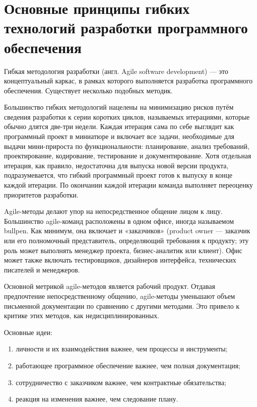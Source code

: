 \documentclass{article}
\let\stdsection\section
\renewcommand\section{\newpage\stdsection}
\begin{document}
\section{Основные принципы гибких технологий разработки программного обеспечения}
    Гибкая методология разработки (англ. Agile software development) — это концептуальный каркас, в рамках которого выполняется разработка программного обеспечения. Существует несколько подобных методик.

    Большинство гибких методологий нацелены на минимизацию рисков путём сведения разработки к серии коротких циклов, называемых итерациями, которые обычно длятся две-три недели. Каждая итерация сама по себе выглядит как программный проект в миниатюре и включает все задачи, необходимые для выдачи мини-прироста по функциональности: планирование, анализ требований, проектирование, кодирование, тестирование и документирование. Хотя отдельная итерация, как правило, недостаточна для выпуска новой версии продукта, подразумевается, что гибкий программный проект готов к выпуску в конце каждой итерации. По окончании каждой итерации команда выполняет переоценку приоритетов разработки.

    Agile-методы делают упор на непосредственное общение лицом к лицу. Большинство agile-команд расположены в одном офисе, иногда называемом bullpen. Как минимум, она включает и «заказчиков» (product owner — заказчик или его полномочный представитель, определяющий требования к продукту; эту роль может выполнять менеджер проекта, бизнес-аналитик или клиент). Офис может также включать тестировщиков, дизайнеров интерфейса, технических писателей и менеджеров.

    Основной метрикой agile-методов является рабочий продукт. Отдавая предпочтение непосредственному общению, agile-методы уменьшают объем письменной документации по сравнению с другими методами. Это привело к критике этих методов, как недисциплинированных.

    Основные идеи:
    \begin{enumerate}
        \item личности и их взаимодействия важнее, чем процессы и инструменты;
        \item работающее программное обеспечение важнее, чем полная документация;
        \item сотрудничество с заказчиком важнее, чем контрактные обязательства;
        \item реакция на изменения важнее, чем следование плану.
    \end{enumerate}
\end{document}
